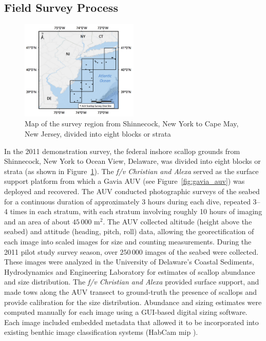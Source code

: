 \documentclass {udthesis}
\begin{document}
\subsection{Field Survey Process}
%
\begin{figure}
\centering
\includegraphics[width=0.5\textwidth, natwidth=944, natheight=800]{survey_region}
\caption[Map of the scallop survey region]{Map of the survey region from Shinnecock, New York to Cape May, New Jersey, 
divided into eight blocks or strata}
\label{fig:strata}
\end{figure}
%

In the 2011 demonstration survey, the federal inshore scallop grounds from Shinnecock, New York to Ocean View, Delaware, was divided into eight blocks or strata (as shown in Figure~\ref{fig:strata}).  
The \textit{f/v Christian and Alexa} served as the surface support platform 
from which a Gavia AUV (see Figure~\ref{fig:gavia_auv}) was deployed and recovered.  The AUV 
conducted photographic surveys of the seabed for a continuous duration of approximately
3 hours during each dive, repeated 3--4 times in each stratum, with
each stratum involving roughly 10 hours of imaging and an area of about $45\,000$ 
m$^2$.
The AUV collected altitude (height above the seabed) and 
attitude (heading, pitch, roll) data, allowing the georectification of each image 
into scaled images for size and counting measurements.  During the 2011 pilot study 
survey season, over $250\,000$ images of the seabed were collected. 
These images were analyzed in the University of Delaware's Coastal Sediments, Hydrodynamics and Engineering 
Laboratory for estimates of scallop
abundance and size distribution.  The \textit{f/v Christian and Alexa} provided 
surface support, and made tows along the AUV transect to ground-truth the presence of 
scallops and provide calibration for the size distribution. 
Abundance and sizing estimates were computed manually for each image using a GUI-based 
digital sizing software. 
Each image included embedded metadata that 
allowed it to be incorporated into existing benthic image classification systems
(HabCam mip \cite{dawkings13}).
\end{document}
